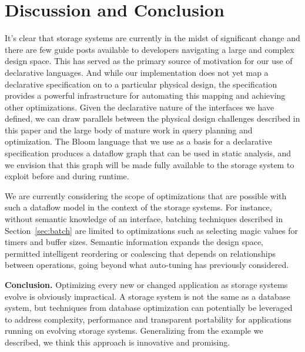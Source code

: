 \section{Discussion and Conclusion}
\label{sec:opts}

It's clear that storage systems are currently in the midst of significant
change and there are few guide posts available to developers navigating a
large and complex design space. This has served as the primary source
of motivation for our use of declarative languages. And while our
implementation does not yet map a declarative specification on to a particular
physical design, the specification provides a powerful infrastructure for
automating this mapping and achieving other optimizations.
Given the declarative nature of the interfaces we have defined, we can draw
parallels between the physical design challenges described in this paper and
the large body of mature work in query planning and optimization.  The Bloom
language that we use as a basis for a declarative specification
produces a dataflow graph that can be used in static analysis, and we
envision that this graph will be made fully available to the storage system to
exploit before and during runtime.

We are currently considering the scope of optimizations that are possible with
such a dataflow model in the context of the storage systems. For instance, without
semantic knowledge of an interface, batching techniques described in
Section~\ref{sec:batch} are limited to optimizations such as selecting magic
values for timers and buffer sizes. Semantic information expands the design
space, permitted intelligent reordering or coalescing that depends on
relationships between operations, going beyond what auto-tuning has
previously considered.

{\bf Conclusion.} Optimizing every new or changed application as storage
systems evolve is obviously impractical.  A storage system is not the same as a
database system, but techniques from database optimization can potentially be
leveraged to address complexity, performance and transparent portability for
applications running on evolving storage systems.  Generalizing from the
example we described, we think this approach is innovative and promising. 

